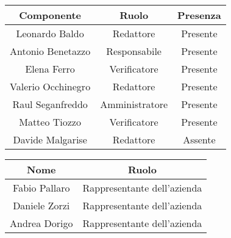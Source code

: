 \documentclass[italian,12pt]{article} %
\begin{document}
\begin{flushleft}
	\begin{table}[!h]
	\begin{tabular}{ |c|c|c| } 
		\hline
		\textbf{Componente} & \textbf{Ruolo} & \textbf{Presenza} \\
		\hline 
		Leonardo Baldo 		& Redattore & Presente \\ 
		Antonio Benetazzo 	& Responsabile & Presente \\
		Elena Ferro 		& Verificatore & Presente \\
		Valerio Occhinegro 	& Redattore & Presente \\
		Raul Seganfreddo 	& Amministratore & Presente \\
		Matteo Tiozzo 		& Verificatore & Presente \\ 
		Davide Malgarise 	& Redattore & Assente \\
		\hline
	\end{tabular}

	\vspace{1cm}

	\begin{tabular}{ |c|c| } 
		\hline
		\textbf{Nome} & \textbf{Ruolo} \\
		\hline 
		Fabio Pallaro & Rappresentante dell'azienda \\
		Daniele Zorzi & Rappresentante dell'azienda \\
		Andrea Dorigo & Rappresentante dell'azienda \\

		\hline
	\end{tabular}
\end{table}

\end{flushleft}


\newpage
\end{document}
